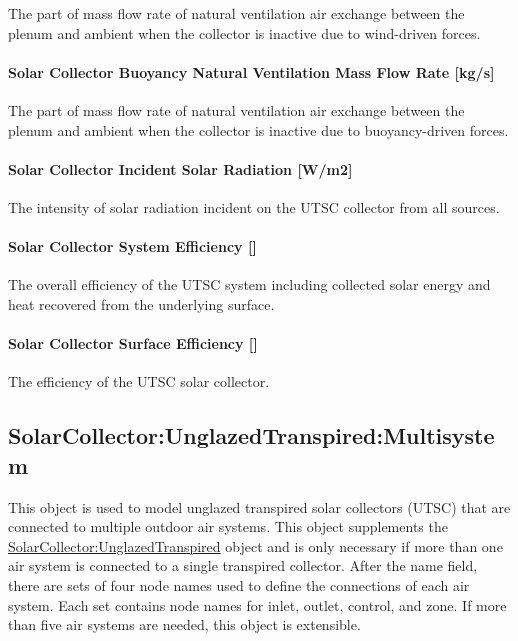 The part of mass flow rate of natural ventilation air exchange between the plenum and ambient when the collector is inactive due to wind-driven forces.

\paragraph{Solar Collector Buoyancy Natural Ventilation Mass Flow Rate {[}kg/s{]}}\label{solar-collector-buoyancy-natural-ventilation-mass-flow-rate-kgs}

The part of mass flow rate of natural ventilation air exchange between the plenum and ambient when the collector is inactive due to buoyancy-driven forces.

\paragraph{Solar Collector Incident Solar Radiation {[}W/m2{]}}\label{solar-collector-incident-solar-radiation-wm2}

The intensity of solar radiation incident on the UTSC collector from all sources.

\paragraph{Solar Collector System Efficiency {[]}}\label{solar-collector-system-efficiency}

The overall efficiency of the UTSC system including collected solar energy and heat recovered from the underlying surface.

\paragraph{Solar Collector Surface Efficiency {[]}}\label{solar-collector-surface-efficiency}

The efficiency of the UTSC solar collector.

\subsection{SolarCollector:UnglazedTranspired:Multisystem}\label{solarcollectorunglazedtranspiredmultisystem}

This object is used to model unglazed transpired solar collectors (UTSC) that are connected to multiple outdoor air systems. This object supplements the \hyperref[solarcollectorunglazedtranspired]{SolarCollector:UnglazedTranspired} object and is only necessary if more than one air system is connected to a single transpired collector. After the name field, there are sets of four node names used to define the connections of each air system. Each set contains node names for inlet, outlet, control, and zone. If more than five air systems are needed, this object is extensible.

